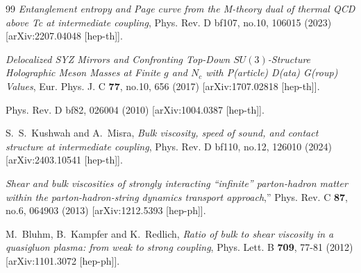 \documentclass[a4paper,11pt,fleqn]{article}
\theoremstyle{plain}
\theoremstyle{definition}
\begin{document}
\begin{thebibliography}{99}
{\it Entanglement entropy and Page curve from the M-theory dual of thermal QCD above Tc at intermediate coupling},
Phys. Rev. D bf{107}, no.10, 106015 (2023) [arXiv:2207.04048 [hep-th]].

{\it Delocalized SYZ Mirrors and Confronting Top-Down $SU(3)$-Structure Holographic Meson Masses at Finite $g$ and $N_c$ with P(article) D(ata) G(roup) Values},
Eur. Phys. J. C {\bf 77}, no.10, 656 (2017)
[arXiv:1707.02818 [hep-th]].

Phys. Rev. D bf{82}, 026004 (2010)
[arXiv:1004.0387 [hep-th]].




S.~S.~Kushwah and A.~Misra,
{\it Bulk viscosity, speed of sound, and contact structure at intermediate coupling}, Phys. Rev. D bf{110}, no.12, 126010 (2024)
[arXiv:2403.10541 [hep-th]].

{\it Shear and bulk viscosities of strongly interacting ``infinite'' parton-hadron matter within the parton-hadron-string dynamics transport approach},''
Phys. Rev. C {\bf 87}, no.6, 064903 (2013)
[arXiv:1212.5393 [hep-ph]].

 M.~Bluhm, B.~Kampfer and K.~Redlich,
{\it Ratio of bulk to shear viscosity in a quasigluon plasma: from weak to strong coupling}, Phys. Lett. B {\bf 709}, 77-81 (2012) [arXiv:1101.3072 [hep-ph]].


\end{thebibliography}
\end{document}
